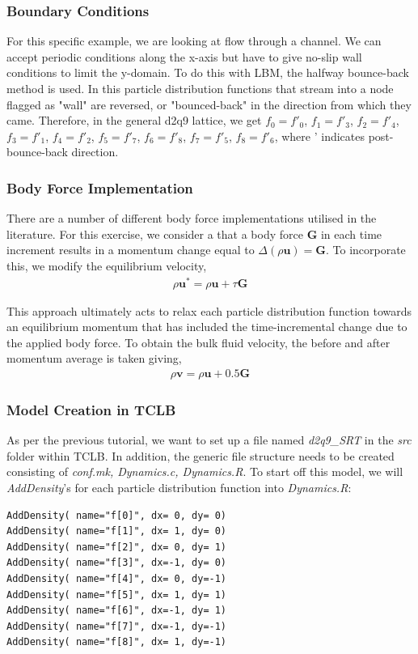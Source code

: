 \documentclass[12pt,a4paper]{report}
\begin{document}
\subsubsection{Boundary Conditions}
For this specific example, we are looking at flow through a channel. We can accept periodic conditions along the x-axis but have to give no-slip wall conditions to limit the y-domain. To do this with LBM, the halfway bounce-back method is used. In this particle distribution functions that stream into a node flagged as "wall" are reversed, or "bounced-back" in the direction from which they came. Therefore, in the general d2q9 lattice, we get $f_0 = f'_0$, $f_1 = f'_3$, $f_2 = f'_4$, $f_3 = f'_1$, $f_4 = f'_2$, $f_5 = f'_7$, $f_6 = f'_8$, $f_7 = f'_5$, $f_8 = f'_6$, where ' indicates post-bounce-back direction.

\subsubsection{Body Force Implementation}
There are a number of different body force implementations utilised in the literature. For this exercise, we consider a that a body force $\mathbf{G}$ in each time increment results in a momentum change equal to $\Delta(\rho \mathbf{u})=\mathbf{G}$. To incorporate this, we modify the equilibrium velocity,
\begin{align*}
\rho \mathbf{u}^* = \rho \mathbf{u}+\tau\mathbf{G}
\end{align*} 

This approach ultimately acts to relax each particle distribution function towards an equilibrium momentum that has included the time-incremental change due to the applied body force. To obtain the bulk fluid velocity, the before and after momentum average is taken giving,
\begin{align*}
\rho \mathbf{v} = \rho \mathbf{u}+0.5\mathbf{G}
\end{align*}

\subsubsection{Model Creation in TCLB}
As per the previous tutorial, we want to set up a file named \textit{d2q9\_SRT} in the \textit{src} folder within TCLB. In addition, the generic file structure needs to be created consisting of \textit{conf.mk, Dynamics.c, Dynamics.R}. To start off this model, we will \textit{AddDensity}'s for each particle distribution function into \textit{Dynamics.R}:
\begin{lstlisting}
AddDensity( name="f[0]", dx= 0, dy= 0)
AddDensity( name="f[1]", dx= 1, dy= 0)
AddDensity( name="f[2]", dx= 0, dy= 1)
AddDensity( name="f[3]", dx=-1, dy= 0)
AddDensity( name="f[4]", dx= 0, dy=-1)
AddDensity( name="f[5]", dx= 1, dy= 1)
AddDensity( name="f[6]", dx=-1, dy= 1)
AddDensity( name="f[7]", dx=-1, dy=-1)
AddDensity( name="f[8]", dx= 1, dy=-1)
\end{lstlisting} 
\end{document}

